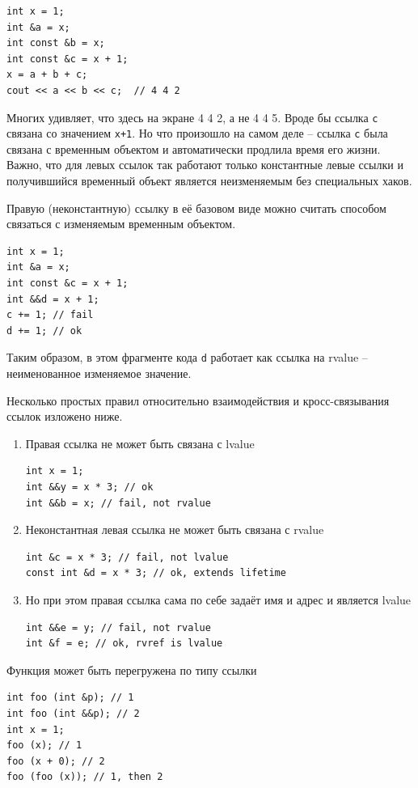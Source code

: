 \documentclass[a4paper,12pt,oneside]{article}
\begin{document}
\begin{lstlisting}
int x = 1;
int &a = x;
int const &b = x;
int const &c = x + 1;
x = a + b + c;
cout << a << b << c;  // 4 4 2
\end{lstlisting}

Многих удивляет, что здесь на экране 4 4 2, а не 4 4 5. Вроде бы ссылка \lstinline!c! связана со значением \lstinline!x+1!. Но что произошло на самом деле -- ссылка \lstinline!c! была связана с временным объектом и автоматически продлила время его жизни. Важно, что для левых ссылок так работают только константные левые ссылки и получившийся временный объект является неизменяемым без специальных хаков.

Правую (неконстантную) ссылку в её базовом виде можно считать способом связаться с изменяемым временным объектом.

\begin{lstlisting}
int x = 1;
int &a = x;
int const &c = x + 1;
int &&d = x + 1;
c += 1; // fail
d += 1; // ok
\end{lstlisting}

Таким образом, в этом фрагменте кода \lstinline!d! работает как ссылка на rvalue -- неименованное изменяемое значение.

Несколько простых правил относительно взаимодействия и кросс-связывания ссылок изложено ниже.

\begin{enumerate}
\item
Правая ссылка не может быть связана с lvalue
\begin{lstlisting}
int x = 1; 
int &&y = x * 3; // ok
int &&b = x; // fail, not rvalue 
\end{lstlisting}
\item
Неконстантная левая ссылка не может быть связана с rvalue
\begin{lstlisting}
int &c = x * 3; // fail, not lvalue
const int &d = x * 3; // ok, extends lifetime
\end{lstlisting}
\item
Но при этом правая ссылка сама по себе задаёт имя и адрес и является lvalue
\begin{lstlisting}
int &&e = y; // fail, not rvalue
int &f = e; // ok, rvref is lvalue
\end{lstlisting}
\end{enumerate}

Функция может быть перегружена по типу ссылки

\begin{lstlisting}
int foo (int &p); // 1
int foo (int &&p); // 2
int x = 1;
foo (x); // 1
foo (x + 0); // 2
foo (foo (x)); // 1, then 2
\end{lstlisting}
\end{document}

